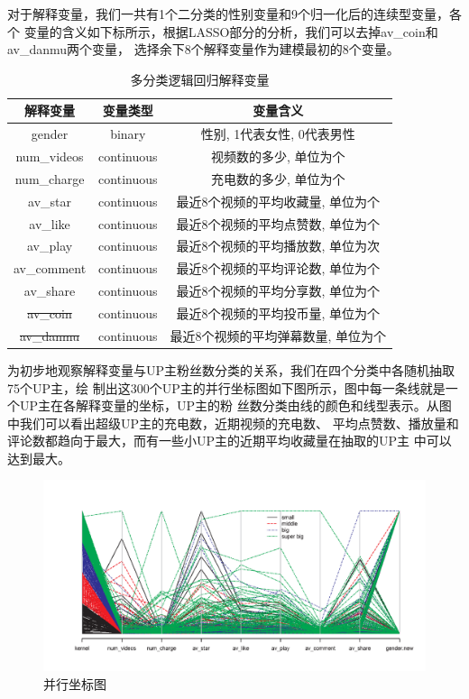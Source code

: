 \documentclass{ctexart}
\begin{document}
对于解释变量，我们一共有1个二分类的性别变量和9个归一化后的连续型变量，各个
变量的含义如下标所示，根据LASSO部分的分析，我们可以去掉av\_coin和av\_danmu两个变量，
选择余下8个解释变量作为建模最初的8个变量。

\begin{table}[H]
    \centering
    \begin{tabular}{ccc}
        \toprule
          解释变量 & 变量类型 & 变量含义  \\
        \midrule
          gender & binary & 性别, 1代表女性, 0代表男性 \\
          num\_videos & continuous & 视频数的多少, 单位为个\\
          num\_charge & continuous & 充电数的多少, 单位为个\\
          av\_star & continuous & 最近8个视频的平均收藏量, 单位为个\\
          av\_like & continuous & 最近8个视频的平均点赞数, 单位为个\\
          av\_play & continuous & 最近8个视频的平均播放数, 单位为次\\
          av\_comment & continuous & 最近8个视频的平均评论数, 单位为个\\
          av\_share & continuous & 最近8个视频的平均分享数, 单位为个\\
          \sout{av\_coin} & continuous & 最近8个视频的平均投币量, 单位为个\\
          \sout{av\_danmu} & continuous & 最近8个视频的平均弹幕数量, 单位为个\\
        \bottomrule
     \end{tabular}
    \caption{多分类逻辑回归解释变量}
\end{table}

为初步地观察解释变量与UP主粉丝数分类的关系，我们在四个分类中各随机抽取75个UP主，绘
制出这300个UP主的并行坐标图如下图所示，图中每一条线就是一个UP主在各解释变量的坐标，UP主的粉
丝数分类由线的颜色和线型表示。从图中我们可以看出超级UP主的充电数，近期视频的充电数、
平均点赞数、播放量和评论数都趋向于最大，而有一些小UP主的近期平均收藏量在抽取的UP主
中可以达到最大。

\begin{figure}[H]
    \centering
    \includegraphics[width=1.0\textwidth]{MLR/Figure_parcoord.png}
    \caption{并行坐标图}
\end{figure}
\end{document}
